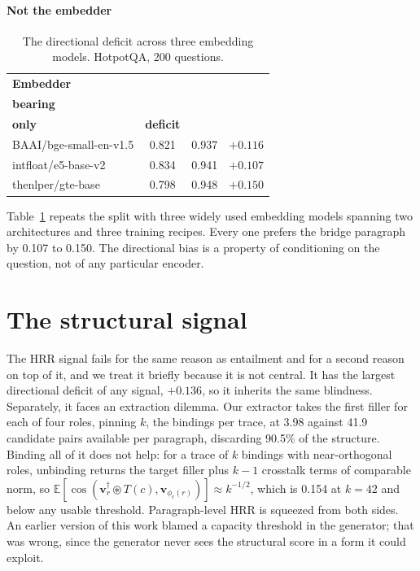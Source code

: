 \documentclass[conference]{IEEEtran}
\newcommand{\conv}{\circledast}
\DeclareMathOperator{\cossim}{cos}
\begin{document}
\paragraph{Not the embedder}
\begin{table}[t]
\centering
\caption{The directional deficit across three embedding models. HotpotQA,
200 questions.}
\label{tab:retrievers}
\begin{tabular}{@{}lccc@{}}
\toprule
\textbf{Embedder} & \makecell{\textbf{answer-}\\\textbf{bearing}} &
\makecell{\textbf{bridge}\\\textbf{only}} & \textbf{deficit}\\
\midrule
BAAI/bge-small-en-v1.5 & 0.821 & 0.937 & $+0.116$\\
intfloat/e5-base-v2    & 0.834 & 0.941 & $+0.107$\\
thenlper/gte-base      & 0.798 & 0.948 & $+0.150$\\
\bottomrule
\end{tabular}
\end{table}

Table~\ref{tab:retrievers} repeats the split with three widely used embedding
models spanning two architectures and three training recipes. Every one prefers
the bridge paragraph by 0.107 to 0.150. The directional bias is a property of
conditioning on the question, not of any particular encoder.

\section{The structural signal}
\label{sec:hrr}

The HRR signal fails for the same reason as entailment and for a second reason
on top of it, and we treat it briefly because it is not central. It has the
largest directional deficit of any signal, $+0.136$, so it inherits the same
blindness. Separately, it faces an extraction dilemma. Our extractor takes the
first filler for each of four roles, pinning $k$, the bindings per trace, at 3.98
against 41.9 candidate pairs available per paragraph, discarding 90.5\% of the
structure. Binding all of it does not help: for a trace of $k$ bindings with
near-orthogonal roles, unbinding returns the target filler plus $k-1$ crosstalk
terms of comparable norm, so
$\mathbb{E}[\cossim(\mathbf{v}_r^{\dagger}\conv T(c),\mathbf{v}_{\phi_c(r)})]
\approx k^{-1/2}$, which is 0.154 at $k=42$ and below any usable threshold.
Paragraph-level HRR is squeezed from both sides. An earlier version of this work
blamed a capacity threshold in the generator; that was wrong, since the
generator never sees the structural score in a form it could exploit.
\end{document}
